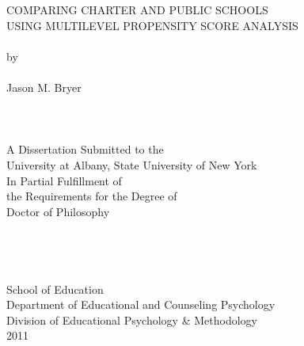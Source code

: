 \documentclass[letterpaper,12p,twoside]{article} %
\begin{document}
\begin{titlepage}
\vspace*{\fill}
\begin{center}
\uppercase{Comparing Charter and Public Schools\\Using Multilevel Propensity Score Analysis}\\
\ \\
by
\ \\ \ \\
Jason M. Bryer\\
\ \\ \ \\ \ \\
A Dissertation Submitted to the\\
University at Albany, State University of New York\\
In Partial Fulfillment of\\
the Requirements for the Degree of\\
Doctor of Philosophy\\
\ \\ \ \\ \ \\ \ \\
School of Education\\
Department of Educational and Counseling Psychology\\
Division of Educational Psychology \& Methodology\\
2011
\end{center}
\vspace*{\fill}
\end{titlepage}
\setcounter{page}{2}
\newpage


\ \\
\cleardoublepage
\end{document}

